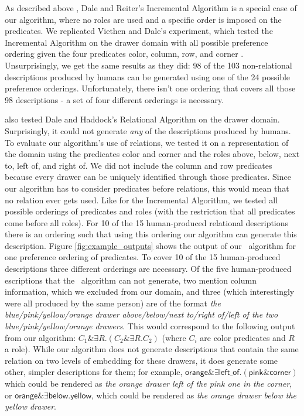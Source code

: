 As described above , Dale and Reiter's
Incremental Algorithm is a special case of our algorithm, where no
roles are used and a specific order is imposed on the predicates. We
replicated Viethen and Dale's experiment, which tested the Incremental
Algorithm on the drawer domain with all possible preference ordering
given the four predicates
\textsf{color, column, row}, and \textsf{corner}
\cite{viethen06:_algor_for_gener_refer_expres}.  Unsurprisingly, we
get the same results as they did: 98 of the 103 non-relational
descriptions produced by humans can be generated using one of the 24
possible preference orderings. Unfortunately, there isn't one ordering
that covers all those 98 descriptions - a set of four different
orderings is necessary.



 also tested Dale and
Haddock's 
Relational Algorithm on the drawer domain. Surprisingly, it could not
generate \textit{any} of the descriptions produced by humans. To
evaluate our algorithm's use of relations, we tested it on a
representation of the domain using the predicates \textsf{color} and
\textsf{corner} and the roles \textsf{above, below, next to, left of},
and \textsf{right of}. We did not include the \textsf{column} and
\textsf{row} predicates because every drawer can be uniquely
identified through those predicates. Since our algorithm has to
consider predicates before relations, this would mean that no relation
ever gets used. Like for the Incremental Algorithm, we tested all
possible orderings of predicates and roles (with the restriction that
all predicates come before all roles). For 10 of the 15 human-produced
relational descriptions there is an ordering such that using this
ordering our algorithm can generate this description. Figure
\ref{fig:example_outputs} shows the output of our \el\ algorithm for
one preference ordering of predicates. To cover 10 of the 15
human-produced descriptions three different orderings are
necessary. Of the five human-produced escriptions that the \el\
algorithm can not generate, two mention column information, which we
excluded from our domain, and three (which interestingly were all
produced by the same person) are of the format \textit{the
blue/pink/yellow/orange drawer above/below/next to/right of/left of
the two blue/pink/yellow/orange drawers}. This would correspond to the
following output from our algorithm: $C_1 \& \exists R . (C_2 \&
\exists R . C_2)$ (where $C_i$ are color predicates and $R$ a
role). While our algorithm does not generate descriptions that contain
the same relation on two levels of embedding for these drawers, it
does generate some other, simpler descriptions for them; for example,
$\textsf{orange} \& \exists
\textsf{left\_of} . (\textsf{pink}
\& \textsf{corner})$ which could be rendered as
\textit{the orange drawer left of the pink one in the corner}, or
$\textsf{orange} \& \exists \textsf{below} . \textsf{yellow}$,
which could be rendered as \textit{the orange drawer below the yellow
drawer}.

